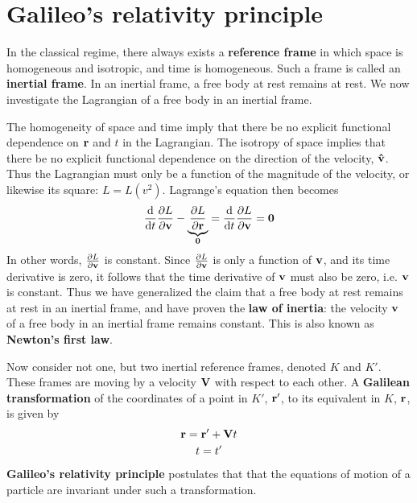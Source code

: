 \documentclass{book}
\begin{document}

\section{Galileo's relativity principle}

In the classical regime, there always exists a \textbf{reference frame} in which space is homogeneous and isotropic, and time is homogeneous. Such a frame is called an \textbf{inertial frame}. In an inertial frame, a free body at rest remains at rest. We now investigate the Lagrangian of a free body in an inertial frame.

The homogeneity of space and time imply that there be no explicit functional dependence on $\vb{r}$ and $t$ in the Lagrangian. The isotropy of space implies that there be no explicit functional dependence on the direction of the velocity, $\vu{v}$. Thus the Lagrangian must only be a function of the magnitude of the velocity, or likewise its square: $L = L(v^2)$. Lagrange's equation then becomes
%
\begin{equation}
  \dv{t} \pdv{L}{\vb{v}} - \underbrace{\pdv{L}{\vb{r}}}_{\vb{0}} =
  \dv{t} \pdv{L}{\vb{v}} =
  \vb{0}
\end{equation}
%
In other words, $\pdv{L}{\vb{v}}$ is constant. Since $\pdv{L}{\vb{v}}$ is only a function of $\vb{v}$, and its time derivative is zero, it follows that the time derivative of $\vb{v}$ must also be zero, i.e. $\vb{v}$ is constant. Thus we have generalized the claim that a free body at rest remains at rest in an inertial frame, and have proven the \textbf{law of inertia}: the velocity $\vb{v}$ of a free body in an inertial frame remains constant. This is also known as \textbf{Newton's first law}.

Now consider not one, but two inertial reference frames, denoted $K$ and $K'$. These frames are moving by a velocity $\vb{V}$ with respect to each other. A \textbf{Galilean transformation} of the coordinates of a point in $K'$, $\vb{r}'$, to its equivalent in $K$, $\vb{r}$, is given by
%
\begin{gather}
  \vb{r} = \vb{r}' + \vb{V} t
  \\
  t = t'
\end{gather}
%
\textbf{Galileo's relativity principle} postulates that that the equations of motion of a particle are invariant under such a transformation.
\end{document}
